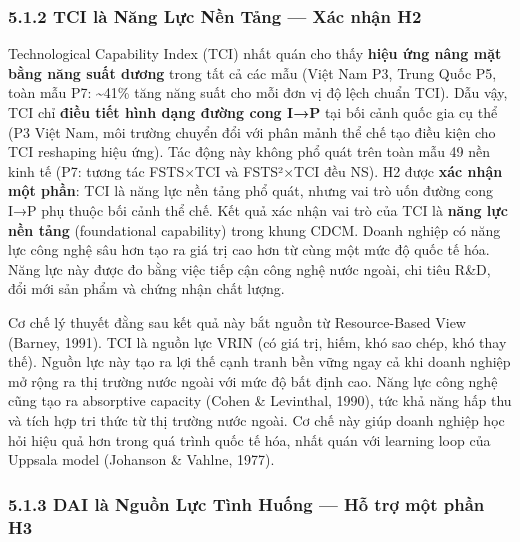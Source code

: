 \documentclass[12pt,a4paper]{article}
\begin{document}
\hypertarget{512-tci-luxe0-nux103ng-lux1ef1c-nux1ec1n-tux1ea3ng--xuxe1c-nhux1eadn-h2}{%
\subsubsection{5.1.2 TCI là Năng Lực Nền Tảng --- Xác nhận
H2}\label{512-tci-luxe0-nux103ng-lux1ef1c-nux1ec1n-tux1ea3ng--xuxe1c-nhux1eadn-h2}}

Technological Capability Index (TCI) nhất quán cho thấy \textbf{hiệu ứng
nâng mặt bằng năng suất dương} trong tất cả các mẫu (Việt Nam P3, Trung
Quốc P5, toàn mẫu P7: \textasciitilde41\% tăng năng suất cho mỗi đơn vị
độ lệch chuẩn TCI). Dẫu vậy, TCI chỉ \textbf{điều tiết hình dạng đường
cong I→P} tại bối cảnh quốc gia cụ thể (P3 Việt Nam, môi trường chuyển
đổi với phân mảnh thể chế tạo điều kiện cho TCI reshaping hiệu ứng). Tác
động này không phổ quát trên toàn mẫu 49 nền kinh tế (P7: tương tác
FSTS×TCI và FSTS²×TCI đều NS). H2 được \textbf{xác nhận một phần}: TCI
là năng lực nền tảng phổ quát, nhưng vai trò uốn đường cong I→P phụ
thuộc bối cảnh thể chế. Kết quả xác nhận vai trò của TCI là \textbf{năng
lực nền tảng} (foundational capability) trong khung CDCM. Doanh nghiệp
có năng lực công nghệ sâu hơn tạo ra giá trị cao hơn từ cùng một mức độ
quốc tế hóa. Năng lực này được đo bằng việc tiếp cận công nghệ nước
ngoài, chi tiêu R\&D, đổi mới sản phẩm và chứng nhận chất lượng.

Cơ chế lý thuyết đằng sau kết quả này bắt nguồn từ Resource-Based View
(Barney, 1991). TCI là nguồn lực VRIN (có giá trị, hiếm, khó sao chép,
khó thay thế). Nguồn lực này tạo ra lợi thế cạnh tranh bền vững ngay cả
khi doanh nghiệp mở rộng ra thị trường nước ngoài với mức độ bất định
cao. Năng lực công nghệ cũng tạo ra absorptive capacity (Cohen \&
Levinthal, 1990), tức khả năng hấp thu và tích hợp tri thức từ thị
trường nước ngoài. Cơ chế này giúp doanh nghiệp học hỏi hiệu quả hơn
trong quá trình quốc tế hóa, nhất quán với learning loop của Uppsala
model (Johanson \& Vahlne, 1977).

\hypertarget{513-dai-luxe0-nguux1ed3n-lux1ef1c-tuxecnh-huux1ed1ng--hux1ed7-trux1ee3-mux1ed9t-phux1ea7n-h3}{%
\subsubsection{5.1.3 DAI là Nguồn Lực Tình Huống --- Hỗ trợ một phần
H3}\label{513-dai-luxe0-nguux1ed3n-lux1ef1c-tuxecnh-huux1ed1ng--hux1ed7-trux1ee3-mux1ed9t-phux1ea7n-h3}}
\end{document}
